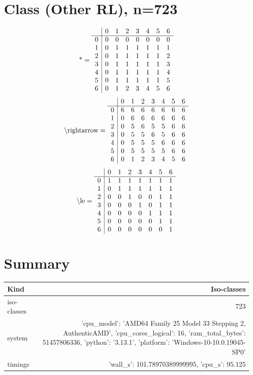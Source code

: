 \documentclass[11pt]{article}
\begin{document}
\section{Class (Other RL), n=723}
\[\text{*} = 
\begin{array}{r | r r r r r r r}
 & 0 & 1 & 2 & 3 & 4 & 5 & 6 \\ \hline
0 & 0 & 0 & 0 & 0 & 0 & 0 & 0 \\
1 & 0 & 1 & 1 & 1 & 1 & 1 & 1 \\
2 & 0 & 1 & 1 & 1 & 1 & 1 & 2 \\
3 & 0 & 1 & 1 & 1 & 1 & 1 & 3 \\
4 & 0 & 1 & 1 & 1 & 1 & 1 & 4 \\
5 & 0 & 1 & 1 & 1 & 1 & 1 & 5 \\
6 & 0 & 1 & 2 & 3 & 4 & 5 & 6 \\
\end{array}
\]
\[\text{\textbackslash rightarrow} = 
\begin{array}{r | r r r r r r r}
 & 0 & 1 & 2 & 3 & 4 & 5 & 6 \\ \hline
0 & 6 & 6 & 6 & 6 & 6 & 6 & 6 \\
1 & 0 & 6 & 6 & 6 & 6 & 6 & 6 \\
2 & 0 & 5 & 6 & 5 & 5 & 6 & 6 \\
3 & 0 & 5 & 5 & 6 & 5 & 6 & 6 \\
4 & 0 & 5 & 5 & 5 & 6 & 6 & 6 \\
5 & 0 & 5 & 5 & 5 & 5 & 6 & 6 \\
6 & 0 & 1 & 2 & 3 & 4 & 5 & 6 \\
\end{array}
\]
\[\text{\textbackslash le} = 
\begin{array}{r | r r r r r r r}
 & 0 & 1 & 2 & 3 & 4 & 5 & 6 \\ \hline
0 & 1 & 1 & 1 & 1 & 1 & 1 & 1 \\
1 & 0 & 1 & 1 & 1 & 1 & 1 & 1 \\
2 & 0 & 0 & 1 & 0 & 0 & 1 & 1 \\
3 & 0 & 0 & 0 & 1 & 0 & 1 & 1 \\
4 & 0 & 0 & 0 & 0 & 1 & 1 & 1 \\
5 & 0 & 0 & 0 & 0 & 0 & 1 & 1 \\
6 & 0 & 0 & 0 & 0 & 0 & 0 & 1 \\
\end{array}
\]

\section*{Summary}
\begin{tabular}{lr}
\toprule
Kind & Iso-classes\\\midrule
iso-classes & 723\\
system & {'cpu_model': 'AMD64 Family 25 Model 33 Stepping 2, AuthenticAMD', 'cpu_cores_logical': 16, 'ram_total_bytes': 51457806336, 'python': '3.13.1', 'platform': 'Windows-10-10.0.19045-SP0'}\\
timings & {'wall_s': 101.78970389999995, 'cpu_s': 95.125}\\
\bottomrule
\end{tabular}
\end{document}
